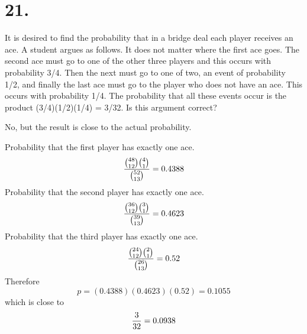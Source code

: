 \section*{21.}
It is desired to find the probability that in a bridge deal each player receives an
ace. A student argues as follows. It does not matter where the first ace goes.
The second ace must go to one of the other three players and this occurs with
probability 3/4. Then the next must go to one of two, an event of probability
1/2, and finally the last ace must go to the player who does not have an ace.
This occurs with probability 1/4. The probability that all these events occur
is the product (3/4)(1/2)(1/4) = 3/32. Is this argument correct?

\bigskip
\noindent
No, but the result is close to the actual probability.

\bigskip
\noindent
Probability that the first player has exactly one ace.
$${{48\choose12}{4\choose1}\over{52\choose13}}=0.4388$$
Probability that the second player has exactly one ace.
$${{36\choose12}{3\choose1}\over{39\choose13}}=0.4623$$
Probability that the third player has exactly one ace.
$${{24\choose12}{2\choose1}\over{26\choose13}}=0.52$$
Therefore
$$p=(0.4388)(0.4623)(0.52)=0.1055$$
which is close to
$${3\over32}=0.0938$$

